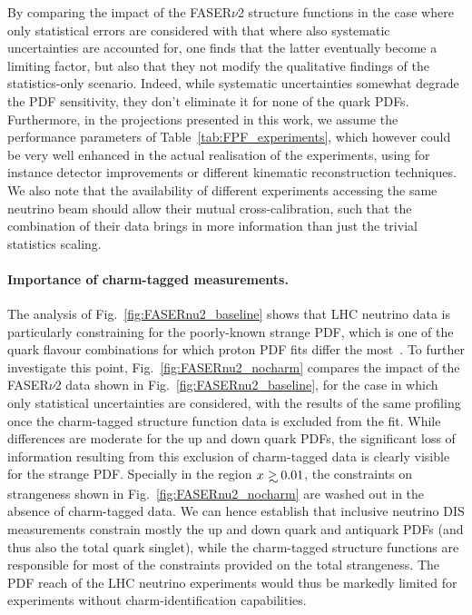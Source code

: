 By comparing the impact of the FASER$\nu$2 structure functions
in the case where only statistical errors are considered with that
where also systematic uncertainties are accounted for,
one finds that the latter eventually become a limiting factor,
but also that they not modify the qualitative findings of the statistics-only scenario.
%
Indeed, while systematic uncertainties somewhat degrade the PDF sensitivity,
they don't eliminate it for none of the quark PDFs.
%
Furthermore, in the projections presented in this work,
we assume the performance parameters of  Table~\ref{tab:FPF_experiments}, which
however could be very well enhanced in the actual realisation of the experiments,
using for instance detector improvements or different kinematic reconstruction techniques.
%
We also note that the availability of different experiments accessing the same neutrino
beam should allow their mutual cross-calibration, such that the combination of their
data brings in more information than just the trivial statistics scaling.

\paragraph{Importance of charm-tagged measurements.}
%
The analysis of Fig.~\ref{fig:FASERnu2_baseline} shows that LHC neutrino data is particularly
constraining for the poorly-known strange PDF, which is one of the quark flavour combinations
for which proton PDF fits differ the most~\cite{Faura:2020oom}.
%
To further investigate this point, Fig.~\ref{fig:FASERnu2_nocharm} compares the impact of the FASER$\nu$2 data shown in
Fig.~\ref{fig:FASERnu2_baseline}, for the case in which only statistical
uncertainties are considered, with the results of the same profiling once the charm-tagged
structure function data is excluded from the fit.
%
While differences are moderate for the up and down quark PDFs, the significant loss
of information resulting from this exclusion of charm-tagged data is clearly
visible for the strange PDF.
%
Specially in the region $x\gsim 0.01$, the constraints on strangeness shown in
Fig.~\ref{fig:FASERnu2_nocharm} are washed out in the absence of charm-tagged data.
%
We can hence establish that inclusive neutrino DIS measurements constrain mostly
the up and down quark and antiquark PDFs (and thus also the total quark singlet), while the charm-tagged
structure functions are responsible for most of the constraints provided on the total strangeness.
%
The PDF reach of the LHC neutrino experiments would thus be  markedly limited for experiments without
charm-identification capabilities.

